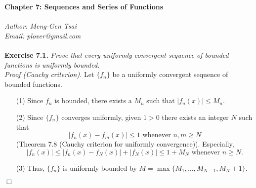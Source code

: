 \documentclass{article}
\begin{document}
\textbf{\Large Chapter 7: Sequences and Series of Functions} \\\\



\emph{Author: Meng-Gen Tsai} \\
\emph{Email: plover@gmail.com} \\\\









\textbf{Exercise 7.1.}
\emph{Prove that every uniformly convergent sequence of bounded functions
is uniformly bounded.} \\

\emph{Proof (Cauchy criterion).}
Let $\{f_n\}$ be a uniformly convergent sequence of bounded functions.
\begin{enumerate}
\item[(1)]
Since $f_n$ is bounded, there exists a $M_n$ such that $|f_n(x)| \leq M_n$.

\item[(2)]
Since $\{f_n\}$ converges uniformly, given $1 > 0$ there exists an integer $N$
such that
\[
  |f_n(x) - f_m(x)| \leq 1 \text{ whenever } n, m \geq N
\]
(Theorem 7.8 (Cauchy criterion for uniformly convergence)).
Especially,
\[
  |f_n(x)| \leq |f_n(x) - f_N(x)| + |f_N(x)| \leq 1 + M_N \text{ whenever } n \geq N.
\]

\item[(3)]
Thus, $\{f_n\}$ is uniformly bounded by $M = \max\{ M_1, \ldots, M_{N-1}, M_{N}+1 \}$.
\end{enumerate}
$\Box$ \\\\



\end{document}
